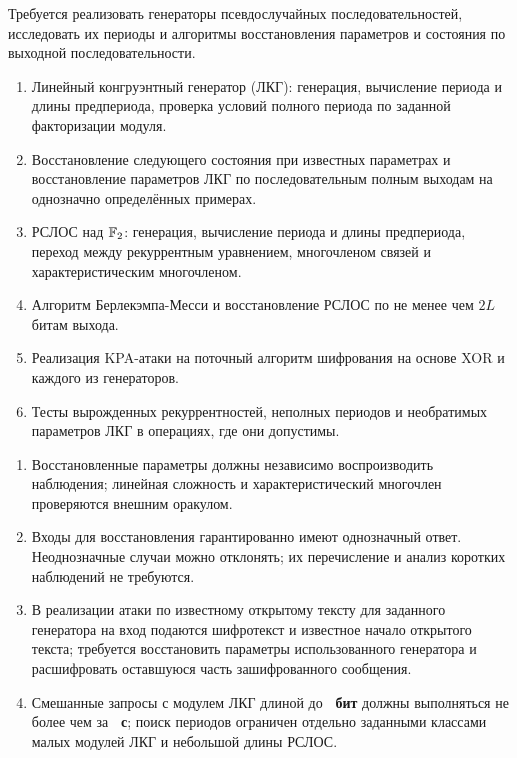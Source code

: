 \documentclass{ca-capstone}
\begin{document}


\goal
Требуется реализовать генераторы псевдослучайных последовательностей, исследовать их периоды
и алгоритмы восстановления параметров и состояния по выходной последовательности.

\functionality
\begin{enumerate}
  \item Линейный конгруэнтный генератор (ЛКГ): генерация, вычисление периода и длины
    предпериода, проверка условий полного периода по заданной факторизации модуля.
  \item Восстановление следующего состояния при известных параметрах и восстановление
    параметров ЛКГ по последовательным полным выходам на однозначно определённых примерах.
  \item РСЛОС над $\mathbb{F}_{2}$: генерация, вычисление периода и длины предпериода, переход между
    рекуррентным уравнением, многочленом связей и характеристическим многочленом.
  \item Алгоритм Берлекэмпа-Месси и восстановление РСЛОС по не менее чем $2L$ битам выхода.
  \item Реализация KPA-атаки на поточный алгоритм шифрования на основе XOR и каждого из генераторов.
  \item Тесты вырожденных рекуррентностей, неполных периодов и необратимых параметров ЛКГ
    в операциях, где они допустимы.
\end{enumerate}

\requirements
\begin{enumerate}
  \item Восстановленные параметры должны независимо воспроизводить наблюдения; линейная
    сложность и характеристический многочлен проверяются внешним оракулом.
  \item Входы для восстановления гарантированно имеют однозначный ответ. Неоднозначные случаи
    можно отклонять; их перечисление и анализ коротких наблюдений не требуются.
  \item В реализации атаки по известному открытому тексту для заданного генератора на вход подаются
    шифротекст и известное начало открытого текста; требуется восстановить параметры использованного
    генератора и расшифровать оставшуюся часть зашифрованного сообщения.
  \item Смешанные запросы с модулем ЛКГ длиной до \textbf{\ReqBitsMax~бит} должны выполняться
    не более чем за \textbf{\ReqSeconds~с}; поиск периодов ограничен отдельно заданными классами
    малых модулей ЛКГ и небольшой длины РСЛОС.
\end{enumerate}
\end{document}
